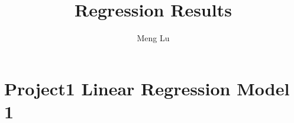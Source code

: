 \documentclass{article}
\begin{document}
 



\title{Regression Results}
\author{\small{Meng Lu}}


\maketitle
\section{Project1 Linear Regression Model 1}
\end{document}
